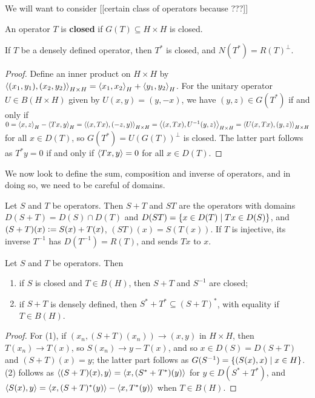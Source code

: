 \documentclass[10pt]{amsart}
\begin{document}
We will want to consider [[certain class of operators because ???]]
\begin{definition}
    An operator $T$ is \textbf{closed} if $G(T) \subseteq H \times H$ is closed.
\end{definition}
\begin{proposition}
    If $T$ be a densely defined operator, then $T^*$ is closed, and $N(T^*) = R(T)^\perp$.
\end{proposition}
\begin{proof}
    Define an inner product on $H \times H$ by $\left\langle (x_1, y_1), (x_2, y_2) \right\rangle_{H \times H} = \left\langle x_1, x_2 \right\rangle_H + \left\langle y_1, y_2 \right\rangle_H$. For the unitary operator $U \in B(H \times H)$ given by $U(x, y) = (y, -x)$, we have $(y, z) \in G(T^*)$ if and only if $0 = \left\langle x, z \right\rangle_H - \left\langle Tx, y \right\rangle_H = \left\langle (x, Tx), (-z, y) \right\rangle_{H \times H} = \left\langle (x, Tx), U^{-1}(y, z) \right\rangle_{H \times H} = \left\langle U(x, Tx), (y, z) \right\rangle_{H \times H}$
    for all $x \in D(T)$, so $G(T^*) = U(G(T))^\perp$ is closed. The latter part follows as $T^*y = 0$ if and only if $\left\langle Tx, y \right\rangle = 0$ for all $x \in D(T)$.
\end{proof}
We now look to define the sum, composition and inverse of operators, and in doing so, we need to be careful of domains.
\begin{definition}
    Let $S$ and $T$ be operators. Then $S + T$ and $ST$ are the operators with domains $D(S + T) = D(S) \cap D(T)$ and $D(ST) = \left\{  x \in D(T) \mid Tx \in D(S)  \right\}$, and $(S + T)(x) \vcentcolon= S(x) + T(x)$, $(ST)(x) = S(T(x))$. If $T$ is injective, its inverse $T^{-1}$ has $D(T^{-1}) = R(T)$, and sends $Tx$ to $x$.
\end{definition}
\begin{lemma}
    Let $S$ and $T$ be operators. Then
    \begin{enumerate}
        \item if $S$ is closed and $T \in B(H)$, then $S + T$ and $S^{-1}$ are closed;
        \item if $S + T$ is densely defined, then $S^* + T^* \subseteq (S + T)^*$, with equality if $T \in B(H)$.
    \end{enumerate}
\end{lemma}
\begin{proof}
    For (1), if $(x_n, (S + T)(x_n)) \to (x, y)$ in $H \times H$, then $T(x_n) \to T(x)$, so $S(x_n) \to y - T(x)$, and so $x \in D(S) = D(S + T)$ and $(S + T)(x) = y$; the latter part follows as $G(S^{-1}) = \left\{  (S(x), x) \mid x \in H  \right\}$. (2) follows as $\left\langle (S + T)(x), y \right\rangle = \left\langle x, (S^* + T^*)(y) \right\rangle$ for $y \in D(S^* + T^*)$, and $\left\langle S(x), y \right\rangle = \left\langle x, (S + T)^*(y) \right\rangle - \left\langle x, T^*(y) \right\rangle$ when $T \in B(H)$.
\end{proof}
\end{document}
